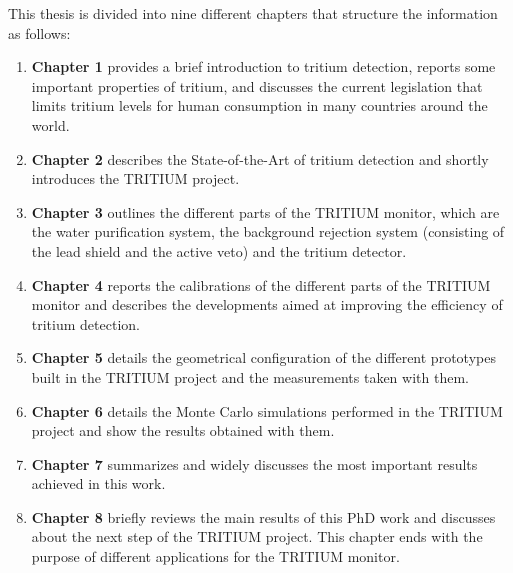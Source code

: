 This thesis is divided into nine different chapters that structure the information as follows:

\begin{enumerate}
\item{} \textbf{Chapter 1} provides a brief introduction to tritium detection, reports some important properties of tritium, and discusses the current legislation that limits tritium levels for human consumption in many countries around the world. 

\item{} \textbf{Chapter 2} describes the State-of-the-Art of tritium detection and shortly introduces the TRITIUM project. 

\item{} \textbf{Chapter 3} outlines the different parts of the TRITIUM monitor, which are the water purification system, the background rejection system (consisting of the lead shield and the active veto)  and the tritium detector. 

\item{} \textbf{Chapter 4} reports the calibrations of the different parts of the TRITIUM monitor and describes the developments aimed at improving the efficiency of tritium detection. 

\item{} \textbf{Chapter 5} details the geometrical configuration of the different prototypes built in the TRITIUM project and the measurements taken with them. 

\item{} \textbf{Chapter 6} details the Monte Carlo simulations performed in the TRITIUM project and show the results obtained with them. 

\item{} \textbf{Chapter 7} summarizes and widely discusses the most important results achieved in this work.

\item{} \textbf{Chapter 8} briefly reviews the main results of this PhD work and discusses about the next step of the TRITIUM project. This chapter ends with the purpose of different applications for the TRITIUM monitor.

\end{enumerate}

